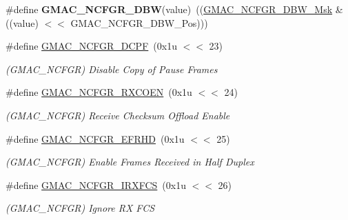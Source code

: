 \begin{DoxyCompactItemize}
\#define {\bfseries G\+M\+A\+C\+\_\+\+N\+C\+F\+G\+R\+\_\+\+D\+BW}(value)~((\mbox{\hyperlink{group__SAMV71__GMAC_ga22a3e61570b9c91999eee595eb80e7ea}{G\+M\+A\+C\+\_\+\+N\+C\+F\+G\+R\+\_\+\+D\+B\+W\+\_\+\+Msk}} \& ((value) $<$$<$ G\+M\+A\+C\+\_\+\+N\+C\+F\+G\+R\+\_\+\+D\+B\+W\+\_\+\+Pos)))
\item 
\mbox{\label{group__SAME70__GMAC_gaea8a144405e81e588aa521ff38de9513}} 
\#define \mbox{\hyperlink{group__SAME70__GMAC_gaea8a144405e81e588aa521ff38de9513}{G\+M\+A\+C\+\_\+\+N\+C\+F\+G\+R\+\_\+\+D\+C\+PF}}~(0x1u $<$$<$ 23)
\begin{DoxyCompactList}\small\item\em (G\+M\+A\+C\+\_\+\+N\+C\+F\+GR) Disable Copy of Pause Frames \end{DoxyCompactList}\item 
\mbox{\label{group__SAME70__GMAC_gafb7b23d348e90c9649fd2407c0e8dc18}} 
\#define \mbox{\hyperlink{group__SAME70__GMAC_gafb7b23d348e90c9649fd2407c0e8dc18}{G\+M\+A\+C\+\_\+\+N\+C\+F\+G\+R\+\_\+\+R\+X\+C\+O\+EN}}~(0x1u $<$$<$ 24)
\begin{DoxyCompactList}\small\item\em (G\+M\+A\+C\+\_\+\+N\+C\+F\+GR) Receive Checksum Offload Enable \end{DoxyCompactList}\item 
\mbox{\label{group__SAME70__GMAC_ga687081e221ae5a20121485fdb775c689}} 
\#define \mbox{\hyperlink{group__SAME70__GMAC_ga687081e221ae5a20121485fdb775c689}{G\+M\+A\+C\+\_\+\+N\+C\+F\+G\+R\+\_\+\+E\+F\+R\+HD}}~(0x1u $<$$<$ 25)
\begin{DoxyCompactList}\small\item\em (G\+M\+A\+C\+\_\+\+N\+C\+F\+GR) Enable Frames Received in Half Duplex \end{DoxyCompactList}\item 
\mbox{\label{group__SAME70__GMAC_gac94d24190c16ca0634fc80cf82f32d7a}} 
\#define \mbox{\hyperlink{group__SAME70__GMAC_gac94d24190c16ca0634fc80cf82f32d7a}{G\+M\+A\+C\+\_\+\+N\+C\+F\+G\+R\+\_\+\+I\+R\+X\+F\+CS}}~(0x1u $<$$<$ 26)
\begin{DoxyCompactList}\small\item\em (G\+M\+A\+C\+\_\+\+N\+C\+F\+GR) Ignore RX F\+CS \end{DoxyCompactList}\item 
$$
\end{DoxyCompactItemize}
